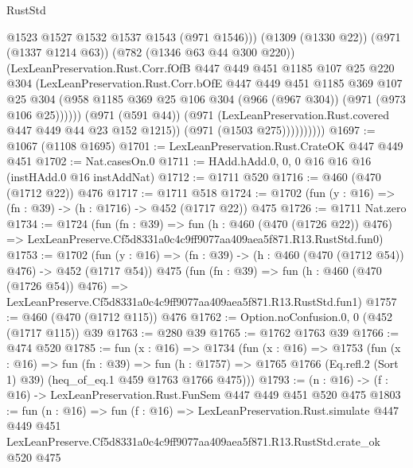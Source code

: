\begin{lexlean}{RustStd}
\begin{coremodule}
                          @1523
                          @1527
                          @1532
                          @1537
                          @1543
                          (@971 @1546)))
                      (@1309 (@1330 @22))
                      (@971 (@1337 @1214 @63))
                      (@782 (@1346 @63 @44 @300 @220))
                      (LexLeanPreservation.Rust.Corr.fOfB
                        @447
                        @449
                        @451
                        @1185
                        @107
                        @25
                        @220
                        @304
                        (LexLeanPreservation.Rust.Corr.bOfE
                          @447
                          @449
                          @451
                          @1185
                          @369
                          @107
                          @25
                          @304
                          (@958
                            @1185
                            @369
                            @25
                            @106
                            @304
                            (@966 (@967 @304))
                            (@971 (@973 @106 @25))))))
                    (@971 (@591 @44))
                    (@971 (LexLeanPreservation.Rust.covered @447 @449 @44 @23 @152 @1215))
                    (@971 (@1503 @275))))))))))
@1697 := @1067 (@1108 @1695)
@1701 := LexLeanPreservation.Rust.CrateOK @447 @449 @451
@1702 := Nat.casesOn.{0}
@1711 := HAdd.hAdd.{0, 0, 0} @16 @16 @16 (instHAdd.{0} @16 instAddNat)
@1712 := @1711 @520
@1716 := @460 (@470 (@1712 @22)) @476
@1717 := @1711 @518
@1724 := @1702 (fun (y : @16) => (fn : @39) -> (h : @1716) -> @452 (@1717 @22)) @475
@1726 := @1711 Nat.zero
@1734 := @1724
    (fun (fn : @39) =>
    fun (h : @460 (@470 (@1726 @22)) @476) =>
    LexLeanPreserve.Cf5d8331a0c4c9ff9077aa409aea5f871.R13.RustStd.fun0)
@1753 := @1702
    (fun (y : @16) => (fn : @39) -> (h : @460 (@470 (@1712 @54)) @476) -> @452 (@1717 @54))
    @475
    (fun (fn : @39) =>
    fun (h : @460 (@470 (@1726 @54)) @476) =>
    LexLeanPreserve.Cf5d8331a0c4c9ff9077aa409aea5f871.R13.RustStd.fun1)
@1757 := @460 (@470 (@1712 @115)) @476
@1762 := Option.noConfusion.{0, 0} (@452 (@1717 @115)) @39
@1763 := @280 @39
@1765 := @1762 @1763 @39
@1766 := @474 @520
@1785 := fun (x : @16) =>
  @1734
    (fun (x : @16) =>
    @1753
      (fun (x : @16) =>
      fun (fn : @39) =>
      fun (h : @1757) =>
      @1765 @1766 (Eq.refl.{2} (Sort 1) @39) (heq_of_eq.{1} @459 @1763 @1766 @475)))
@1793 := (n : @16) -> (f : @16) -> LexLeanPreservation.Rust.FunSem @447 @449 @451 @520 @475
@1803 := fun (n : @16) =>
  fun (f : @16) =>
  LexLeanPreservation.Rust.simulate
    @447
    @449
    @451
    LexLeanPreserve.Cf5d8331a0c4c9ff9077aa409aea5f871.R13.RustStd.crate_ok
    @520
    @475
\end{coremodule}
\end{lexlean}
